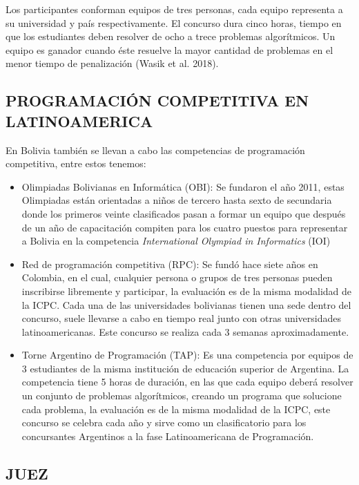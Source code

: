 Los participantes conforman equipos de tres personas, cada equipo representa a su universidad y país respectivamente. El concurso dura cinco horas, tiempo en que los estudiantes deben resolver de ocho a trece problemas algorítmicos. Un equipo es ganador cuando éste resuelve la mayor cantidad de problemas en el menor tiempo de penalización (Wasik et al. 2018).

\subsection{PROGRAMACIÓN COMPETITIVA EN LATINOAMERICA}

En Bolivia también se llevan a cabo las competencias de programación competitiva, entre estos tenemos:
\begin{itemize}
    \item Olimpiadas Bolivianas en Informática (OBI): Se fundaron el año 2011, estas Olimpiadas están orientadas a niños de tercero hasta sexto de secundaria donde los primeros veinte clasificados pasan a formar un equipo que después de un año de capacitación compiten para los cuatro puestos para representar a Bolivia en la competencia \textit{International Olympiad in Informatics} (IOI)
    \item Red de programación competitiva (RPC): Se fundó hace siete años en Colombia, en el cual, cualquier persona o grupos de tres personas pueden inscribirse libremente y participar, la evaluación es de la misma modalidad de la ICPC. Cada una de las universidades bolivianas tienen una sede dentro del concurso, suele llevarse a cabo en tiempo real junto con otras universidades latinoamericanas. Este concurso se realiza cada 3 semanas aproximadamente.
    \item Torne Argentino de Programación (TAP): Es una competencia por equipos de 3 estudiantes de la misma institución de educación superior de Argentina. La competencia tiene 5 horas de duración, en las que cada equipo deberá resolver un conjunto de problemas algorítmicos, creando un programa que solucione cada problema, la evaluación es de la misma modalidad de la ICPC, este concurso se celebra cada año y sirve como un clasificatorio para los concursantes Argentinos a la fase Latinoamericana de Programación.
\end{itemize}

\subsection{JUEZ}


